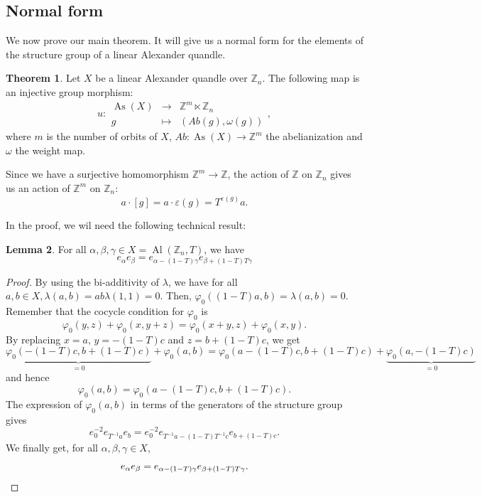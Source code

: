 \documentclass[a4paper,11pt]{amsart}
\theoremstyle{definition}
\newtheorem{thm}{Theorem}
\newtheorem{lem}[thm]{Lemma}
\newcommand{\Z}{{\mathbb Z}}
\DeclareMathOperator{\Al}{Al}
\DeclareMathOperator{\As}{As}
\newcommand{\znz}[1]{\Z_{#1}}
\begin{document}
\subsection{Normal form}
We now prove our main theorem.
It will give us a normal form for the elements of the structure group of a linear Alexander quandle.

\begin{thm}\label{thm:normalform}
Let $X$ be a linear Alexander quandle over $\znz{n}$.
The following map is an injective group morphism:
$$u\colon\begin{array}{ccc}
\As(X) & \longrightarrow & \Z^m \ltimes \znz{n} \\
g & \longmapsto & (Ab(g), \omega(g))
\end{array},$$
where $m$ is the number of orbits of $X$, $Ab\colon \As(X) \to \Z^m$ the abelianization and $\omega$ the weight map.
\end{thm}
Since we have a surjective homomorphism $\Z^m\to \Z$, the action of $\Z$ on $\znz{n}$ gives us an action of $\Z^m$ on $\znz{n}$:
\[
a \cdot [g]= a \cdot \varepsilon(g) = T^{\varepsilon(g)} a.
\]

In the proof, we wil need the following technical result:
\begin{lem}
For all $\alpha, \beta, \gamma \in X=\Al(\znz{n},T)$, we have
\begin{equation}\label{relationlinear}
e_\alpha e_\beta = e_{\alpha-(1-T)\gamma} e_{\beta + (1-T)T\gamma}
\end{equation}
\end{lem}
\begin{proof}
By using the bi-additivity of $\lambda$, we have for all $a,b\in X, \lambda(a,b) = ab\lambda(1,1) = 0$.
Then, $\varphi_0((1-T)a,b) = \lambda(a,b) = 0$.
Remember that the cocycle condition for $\varphi_0$ is
\[
\varphi_0(y,z) + \varphi_0(x,y+z) = \varphi_0(x+y,z) + \varphi_0(x,y).
\]
By replacing $x=a$, $y=-(1-T)c$ and $z=b+(1-T)c$, we get
\[
\underbrace{\varphi_0(-(1-T)c,b+(1-T)c)}_{=0} + \varphi_0(a,b) = \varphi_0(a-(1-T)c, b+(1-T)c) + \underbrace{\varphi_0(a,-(1-T)c)}_{=0}
\]
and hence
\[
\varphi_0(a,b) = \varphi_0(a-(1-T)c, b+(1-T)c).
\]
The expression of $\varphi_0(a,b)$ in terms of the generators of the structure group gives
\[
e_0^{-2} e_{T^{-1}a} e_b = e_0^{-2} e_{T^{-1}a - (1-T)T^{-1}c} e_{b+(1-T)c}.
\]
We finally get, for all $\alpha,\beta,\gamma\in X$,
\[
e_\alpha e_\beta = e_{\alpha-(1-T)\gamma} e_{\beta + (1-T)T\gamma}.\qedhere
\]
\end{proof}
\end{document}
